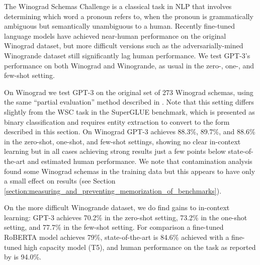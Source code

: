 

The Winograd Schemas Challenge \cite{levesque2012winograd} is a classical task in NLP that involves determining which word a pronoun refers to, when the pronoun is grammatically ambiguous but semantically unambiguous to a human.  Recently fine-tuned language models have achieved near-human performance on the original Winograd dataset, but more difficult versions such as the adversarially-mined Winogrande dataset \cite{sakaguchi2019winogrande} still significantly lag human performance.  We test GPT-3’s performance on both Winograd and Winogrande, as usual in the zero-, one-, and few-shot setting.

On Winograd we test GPT-3 on the original set of 273 Winograd schemas, using the same ``partial evaluation'' method described in \cite{radford2019language}.  Note that this setting differs slightly from the WSC task in the SuperGLUE benchmark, which is presented as binary classification and requires entity extraction to convert to the form described in this section.  On Winograd GPT-3 achieves 88.3\%, 89.7\%, and 88.6\% in the zero-shot, one-shot, and few-shot settings, showing no clear in-context learning but in all cases achieving strong results just a few points below state-of-the-art and estimated human performance.  We note that contamination analysis found some Winograd schemas in the training data but this appears to have only a small effect on results (see Section \ref{section:measuring_and_preventing_memorization_of_benchmarks}).

On the more difficult Winogrande dataset, we do find gains to in-context learning: GPT-3 achieves 70.2\% in the zero-shot setting, 73.2\% in the one-shot setting, and 77.7\% in the few-shot setting.  For comparison a fine-tuned RoBERTA model achieves 79\%, state-of-the-art is 84.6\% achieved with a fine-tuned high capacity model (T5), and human performance on the task as reported by \cite{sakaguchi2019winogrande} is 94.0\%.

